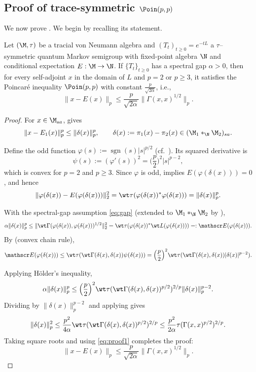 \documentclass[sn-mathphys-num]{sn-jnl}
\begin{document}
\subsection{Proof of trace-symmetric \texorpdfstring{$\Poin(p,p)$}{Poin(p,p)}}\label{sec:ppp-proof}
We now prove . We begin by recalling its statement.
\begin{theorem*}
Let $(\M,\tau)$ be a tracial von Neumann algebra and $(T_t)_{t\ge0}=e^{-tL}$ a $\tau$--symmetric quantum Markov semigroup with fixed-point algebra $\N$ and conditional expectation $E:\M\to\N$.
If $\{T_t\}_{t\ge0}$ has a spectral gap $\alpha>0$, then for every self-adjoint $x$ in the domain of $L$ and $p=2$ or $p\ge3$, it satisfies the Poincar\'e inequality $\Poin(p,p)$ with constant $\tfrac{p}{\sqrt{2\alpha}}$, i.e.,
\[
\|x-E(x)\|_p  \le  \frac{p}{\sqrt{2\alpha}} \|\Gamma(x,x)^{1/2}\|_p.\tag{$\Poin(p,p)$}
\]
\end{theorem*}
\begin{proof}
For $x\in\M_{sa}$,  gives
\begin{equation}\label{eq:proof1}
\|x-E_1(x)\|_p^p \le \|\delta(x)\|_p^p,
\qquad
\delta(x):=\pi_1(x)-\pi_2(x)\in(\M_1*_\N\M_2)_{sa}.
\end{equation}

Define the odd function $\varphi(s):=\operatorname{sgn}(s)|s|^{p/2}$ (cf.\ \cite{huang2021poincare}).
Its squared derivative is
\[
\psi(s):=(\varphi'(s))^2=\Big(\frac p2\Big)^2|s|^{p-2},
\]
which is convex for $p=2$ and $p\ge3$.
Since $\varphi$ is odd,  implies
$E(\varphi(\delta(x)))=0$, and hence
\[
\|\varphi(\delta(x))-E(\varphi(\delta(x)))\|_2^2
=\wt\tau(\varphi(\delta(x))^*\varphi(\delta(x)))
=\|\delta(x)\|_p^p.
\]

With the spectral-gap assumption \eqref{eq:gap}
(extended to $\M_1*_\N\M_2$ by ),
\[
\alpha\|\delta(x)\|_p^p
\le
\|\wt\Gamma(\varphi(\delta(x)),\varphi(\delta(x)))^{1/2}\|_2^2
=\wt\tau(\varphi(\delta(x))^*\wt L(\varphi(\delta(x))))
=:\mathscr E(\varphi(\delta(x))).
\]
By  (convex chain rule),
\[
\mathscr E(\varphi(\delta(x)))
\le
\wt\tau(\wt\Gamma(\delta(x),\delta(x))\psi(\delta(x)))
=\Big(\frac p2\Big)^2
\wt\tau(\wt\Gamma(\delta(x),\delta(x))|\delta(x)|^{p-2}).
\]

Applying Hölder's inequality,
\[
\alpha\|\delta(x)\|_p^p
\le
\Big(\frac p2\Big)^2
\wt\tau(\wt\Gamma(\delta(x),\delta(x))^{p/2})^{2/p}
\|\delta(x)\|_p^{p-2}.
\]
Dividing by $\|\delta(x)\|_p^{p-2}$ and applying  gives
\[
\|\delta(x)\|_p^2
\le
\frac{p^2}{4\alpha}
\wt\tau(\wt\Gamma(\delta(x),\delta(x))^{p/2})^{2/p}\le
\frac{p^2}{2\alpha}
\tau(\Gamma(x,x)^{p/2})^{2/p}.
\]
Taking square roots and using \eqref{eq:proof1} completes the proof:
\[
\|x-E(x)\|_p
\le
\frac p{\sqrt{2\alpha}}
\|\Gamma(x,x)^{1/2}\|_p.
\]
\end{proof}
\end{document}
